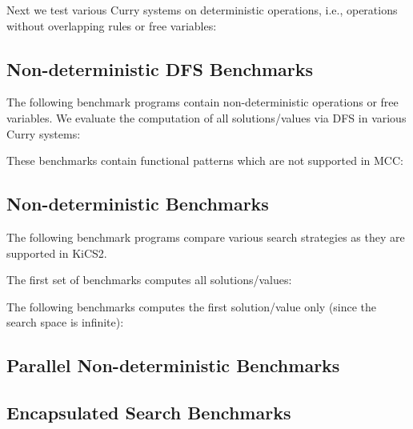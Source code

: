 \documentclass{article}
\begin{document}
Next we test various Curry systems on deterministic operations,
i.e., operations without overlapping rules or free variables:

\begin{center}
\end{center}

\subsection{Non-deterministic DFS Benchmarks}

The following benchmark programs contain non-deterministic operations
or free variables. We evaluate the computation of all
solutions/values via DFS in various Curry systems:

\begin{center}
\end{center}

These benchmarks contain functional patterns which are not supported in MCC:

\begin{center}
\end{center}

\subsection{Non-deterministic Benchmarks}

The following benchmark programs compare various search strategies
as they are supported in KiCS2.

The first set of benchmarks computes all solutions/values:

\begin{center}
\end{center}

The following benchmarks computes the first solution/value
only (since the search space is infinite):

\begin{center}
\end{center}

\subsection{Parallel Non-deterministic Benchmarks}

\begin{center}
\end{center}

\subsection{Encapsulated Search Benchmarks}

\begin{center}
\end{center}
\end{document}

